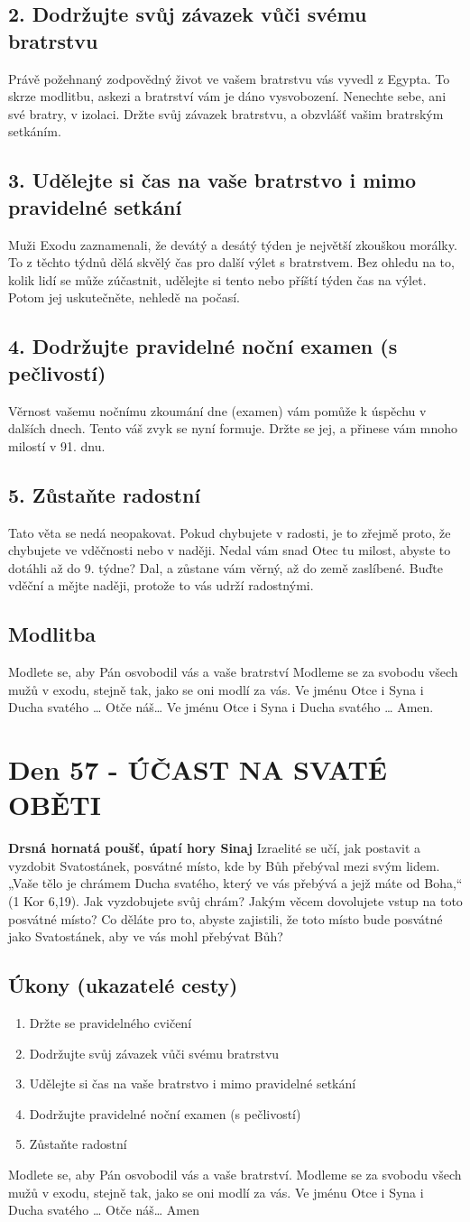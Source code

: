 \documentclass[11pt]{article}
\newcommand{\zacatekDevatyTyden}{
\textbf{Drsná hornatá poušť, úpatí hory Sinaj} \newline 
Izraelité se učí, jak postavit a vyzdobit Svatostánek, posvátné místo, kde by Bůh přebýval mezi svým lidem. „Vaše tělo je chrámem Ducha svatého, který ve vás přebývá a jejž máte od Boha,“ (1 Kor 6,19). Jak vyzdobujete svůj chrám? Jakým věcem dovolujete vstup na toto posvátné místo? Co děláte pro to, abyste zajistili, že toto místo bude posvátné jako Svatostánek, aby ve vás mohl přebývat Bůh?

\subsection*{Úkony (ukazatelé cesty)}
\begin{enumerate}
  \item Držte se pravidelného cvičení
  \item Dodržujte svůj závazek vůči svému bratrstvu
  \item Udělejte si čas na vaše bratrstvo i mimo pravidelné setkání
  \item Dodržujte pravidelné noční examen (s pečlivostí)
  \item Zůstaňte radostní
\end{enumerate}
Modlete se, aby Pán osvobodil vás a vaše bratrství. \newline
Modleme se za svobodu všech mužů v exodu, stejně tak, jako se oni modlí za vás.\newline
Ve jménu Otce i Syna i Ducha svatého …  Otče náš… Amen
}
\begin{document}
\subsection*{2. Dodržujte svůj závazek vůči svému bratrstvu}
Právě požehnaný zodpovědný život ve vašem bratrstvu vás vyvedl z Egypta. To skrze modlitbu, askezi a bratrství vám je dáno vysvobození. Nenechte sebe, ani své bratry, v izolaci. Držte svůj závazek bratrstvu, a obzvlášť vašim bratrským setkáním.
\subsection*{3. Udělejte si čas na vaše bratrstvo i mimo pravidelné setkání}
Muži Exodu zaznamenali, že devátý a desátý týden je největší zkouškou morálky. To z těchto týdnů dělá skvělý čas pro další výlet s bratrstvem. Bez ohledu na to, kolik lidí se může zúčastnit, udělejte si tento nebo příští týden čas na výlet. Potom jej uskutečněte, nehledě na počasí.
\subsection*{4. Dodržujte pravidelné noční examen (s pečlivostí)}
Věrnost vašemu nočnímu zkoumání dne (examen) vám pomůže k úspěchu v dalších dnech. Tento váš zvyk se nyní formuje. Držte se jej, a přinese vám mnoho milostí v 91. dnu.
\subsection*{5. Zůstaňte radostní}
Tato věta se nedá neopakovat. Pokud chybujete v radosti, je to zřejmě proto, že chybujete ve vděčnosti nebo v naději. Nedal vám snad Otec tu milost, abyste to dotáhli až do 9. týdne? Dal, a zůstane vám věrný, až do země zaslíbené. Buďte vděční a mějte naději, protože to vás udrží radostnými.
\subsection*{Modlitba}
Modlete se, aby Pán osvobodil vás a vaše bratrství \newline
Modleme se za svobodu všech mužů v exodu, stejně tak, jako se oni modlí za vás.\newline
Ve jménu Otce i Syna i Ducha svatého … Otče náš… Ve jménu Otce i Syna i Ducha svatého … Amen.
\newpage


\newpage
\section{Den 57 - ÚČAST NA SVATÉ OBĚTI }
\zacatekDevatyTyden
\end{document}
